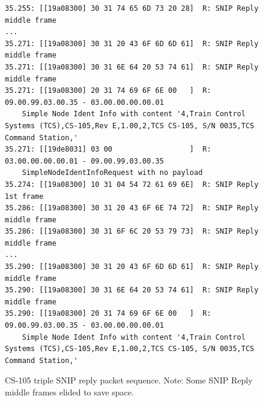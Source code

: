 \documentclass[11pt]{article}
\begin{document}
\begin{figure}[!htbp]
\begin{verbatim}
35.255: [[19a08300] 30 31 74 65 6D 73 20 28]  R: SNIP Reply middle frame
...
35.271: [[19a08300] 30 31 20 43 6F 6D 6D 61]  R: SNIP Reply middle frame
35.271: [[19a08300] 30 31 6E 64 20 53 74 61]  R: SNIP Reply middle frame
35.271: [[19a08300] 20 31 74 69 6F 6E 00   ]  R: 09.00.99.03.00.35 - 03.00.00.00.00.01 
    Simple Node Ident Info with content '4,Train Control Systems (TCS),CS-105,Rev E,1.00,2,TCS CS-105, S/N 0035,TCS Command Station,'
35.271: [[19de8031] 03 00                  ]  R: 03.00.00.00.00.01 - 09.00.99.03.00.35 
    SimpleNodeIdentInfoRequest with no payload
35.274: [[19a08300] 10 31 04 54 72 61 69 6E]  R: SNIP Reply 1st frame
35.286: [[19a08300] 30 31 20 43 6F 6E 74 72]  R: SNIP Reply middle frame
35.286: [[19a08300] 30 31 6F 6C 20 53 79 73]  R: SNIP Reply middle frame
...
35.290: [[19a08300] 30 31 20 43 6F 6D 6D 61]  R: SNIP Reply middle frame
35.290: [[19a08300] 30 31 6E 64 20 53 74 61]  R: SNIP Reply middle frame
35.290: [[19a08300] 20 31 74 69 6F 6E 00   ]  R: 09.00.99.03.00.35 - 03.00.00.00.00.01 
    Simple Node Ident Info with content '4,Train Control Systems (TCS),CS-105,Rev E,1.00,2,TCS CS-105, S/N 0035,TCS Command Station,'
\end{verbatim}
\caption{CS-105 triple SNIP reply packet sequence.
Note: Some SNIP Reply middle frames elided to save space.}
\label{fig:CS105_Triple_SNIP_reply_sequence}
\end{figure}
\end{document}
